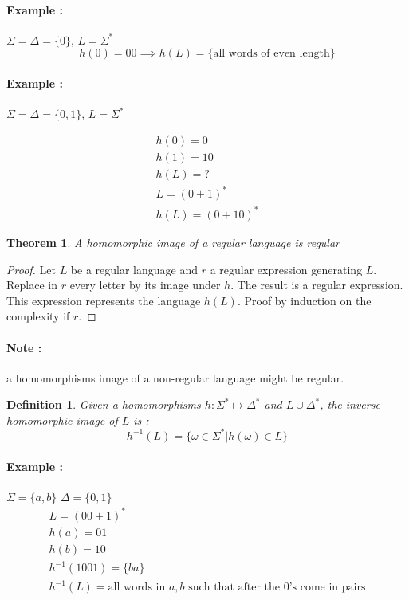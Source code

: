 \documentclass[a4paper,11pt]{article}
\newtheorem{mydef}{Definition}
\newtheorem{thm}{Theorem}[section]
\begin{document}
\paragraph{Example : } $\Sigma = \Delta = \{0\}$, $L = \Sigma^*$
\[
  h(0) = 00 \implies h(L) = \{\text{all words of even length}\}
\]

\paragraph{Example : } $\Sigma = \Delta = \{0,1\}$, $L = \Sigma^*$

\begin{gather*}
  h(0) = 0 \\
  h(1) = 10 \\
  h(L) = ? \\
  L = (0+1)^* \\
  h(L) = (0+10)^*
\end{gather*}

\begin{thm}
  A homomorphic image of a regular language is regular
\end{thm}

\begin{proof}
  Let $L$ be a regular language and $r$ a regular expression generating $L$.
  Replace in $r$ every letter by its image under $h$. The result is a regular
  expression. This expression represents the language $h(L)$. Proof by induction
  on the complexity if $r$.
\end{proof}

\paragraph{Note : } a homomorphisms image of a non-regular language might be
regular.

\begin{mydef}
  Given a homomorphisms $h: \Sigma^* \mapsto \Delta^*$ and $L \cup \Delta^*$,
  the inverse homomorphic image of $L$ is :
  \[
    h^{-1}(L) = \{\omega \in \Sigma^* | h(\omega) \in L\}
  \]
\end{mydef}

\paragraph{Example : } $\Sigma = \{a,b\}$ $\Delta = \{0,1\}$
\begin{gather*}
  L = (00 + 1)^* \\
  h(a) = 01 \\
  h(b) = 10 \\
  h^{-1}(1001) = \{ba\} \\
  h^{-1}(L) = \text{all words in $a,b$ such that after the 0's come in pairs}
\end{gather*}
\end{document}
